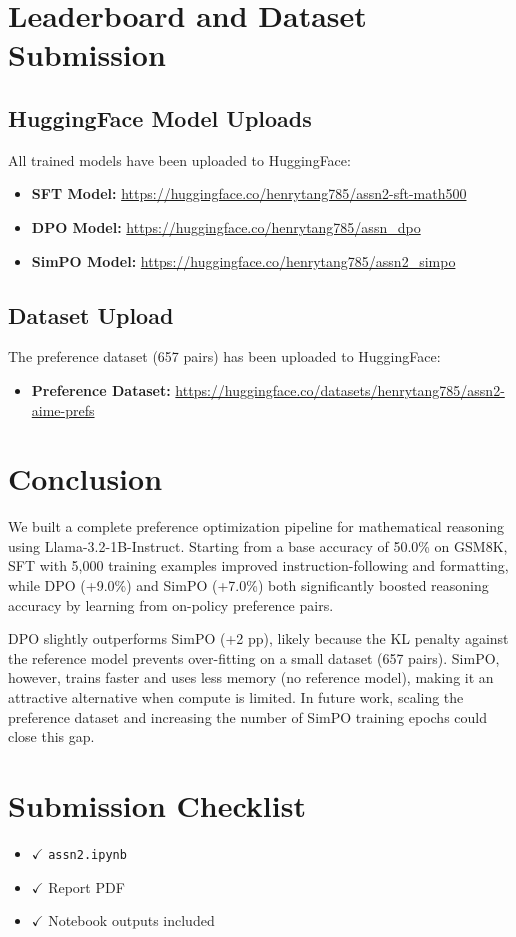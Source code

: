 \documentclass{article}
\begin{document}
\section{Leaderboard and Dataset Submission}

\subsection{HuggingFace Model Uploads}

All trained models have been uploaded to HuggingFace:

\begin{itemize}
    \item \textbf{SFT Model:} \url{https://huggingface.co/henrytang785/assn2-sft-math500}
    \item \textbf{DPO Model:} \url{https://huggingface.co/henrytang785/assn_dpo}
    \item \textbf{SimPO Model:} \url{https://huggingface.co/henrytang785/assn2_simpo}
\end{itemize}


\subsection{Dataset Upload}

The preference dataset (657 pairs) has been uploaded to HuggingFace:

\begin{itemize}
    \item \textbf{Preference Dataset:} \url{https://huggingface.co/datasets/henrytang785/assn2-aime-prefs}
\end{itemize}


\section{Conclusion}

We built a complete preference optimization pipeline for mathematical reasoning using Llama-3.2-1B-Instruct. Starting from a base accuracy of 50.0\% on GSM8K, SFT with 5{,}000 training examples improved instruction-following and formatting, while DPO (+9.0\%) and SimPO (+7.0\%) both significantly boosted reasoning accuracy by learning from on-policy preference pairs.

DPO slightly outperforms SimPO (+2 pp), likely because the KL penalty against the reference model prevents over-fitting on a small dataset (657 pairs). SimPO, however, trains faster and uses less memory (no reference model), making it an attractive alternative when compute is limited. In future work, scaling the preference dataset and increasing the number of SimPO training epochs could close this gap.

\section{Submission Checklist}

\begin{itemize}
    \item $\checkmark$ \texttt{assn2.ipynb}
    \item $\checkmark$ Report PDF
    \item $\checkmark$ Notebook outputs included
\end{itemize}
\end{document}
